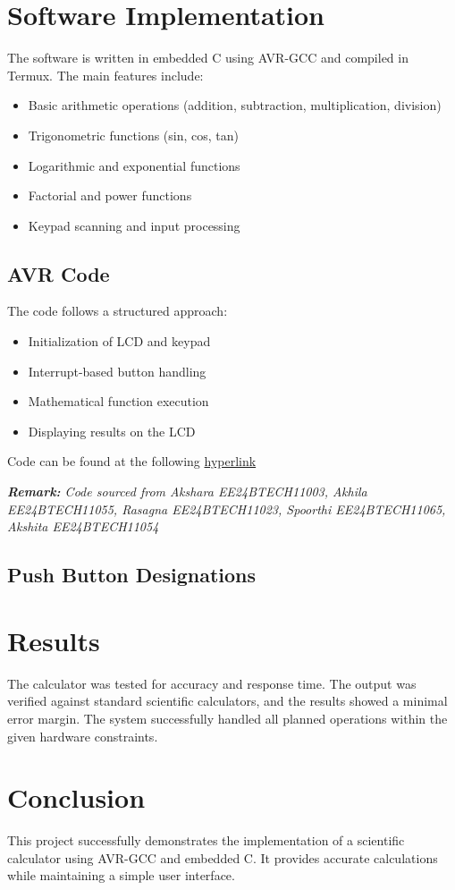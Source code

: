 \documentclass[12pt,a4paper]{article}
\begin{document}
\section{Software Implementation}
The software is written in embedded C using AVR-GCC and compiled in Termux. The main features include:
\begin{itemize}
    \item Basic arithmetic operations (addition, subtraction, multiplication, division)
    \item Trigonometric functions (sin, cos, tan)
    \item Logarithmic and exponential functions
    \item Factorial and power functions
    \item Keypad scanning and input processing
\end{itemize}

\subsection{AVR Code}
The code follows a structured approach:
\begin{itemize}
    \item Initialization of LCD and keypad
    \item Interrupt-based button handling
    \item Mathematical function execution
    \item Displaying results on the LCD
\end{itemize}

Code can be found at the following \href{https://github.com/mandara-h/EE1003/tree/main/Hardware%20Assignment%20-%20Scientific%20Calculator}{hyperlink}

\textit{\textbf{Remark:} Code sourced from Akshara EE24BTECH11003, Akhila EE24BTECH11055, Rasagna EE24BTECH11023, Spoorthi EE24BTECH11065, Akshita EE24BTECH11054}

\subsection{Push Button Designations}


\section{Results}
The calculator was tested for accuracy and response time. The output was verified against standard scientific calculators, and the results showed a minimal error margin. The system successfully handled all planned operations within the given hardware constraints.

\section{Conclusion}
This project successfully demonstrates the implementation of a scientific calculator using AVR-GCC and embedded C. It provides accurate calculations while maintaining a simple user interface.
\end{document}
